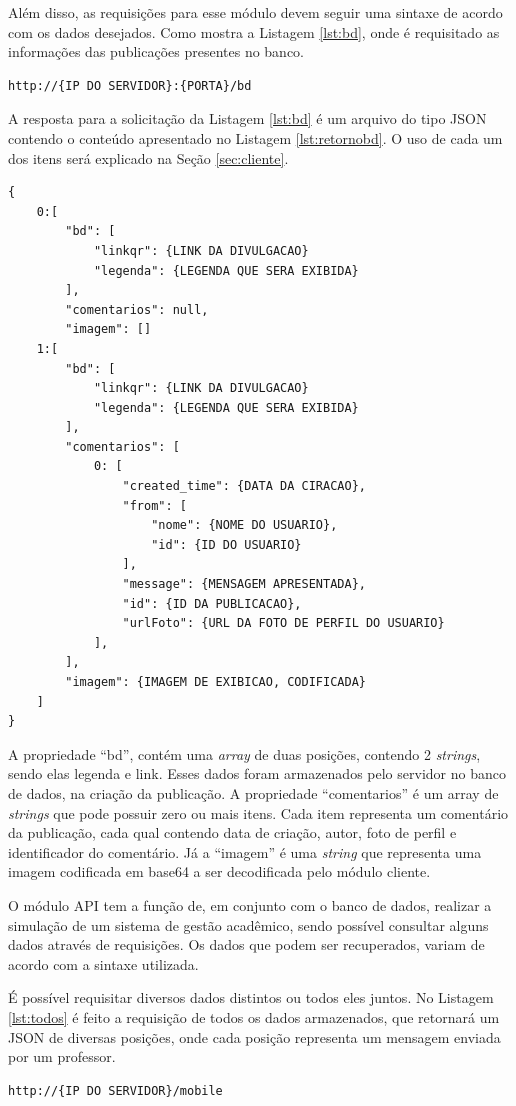 Além disso, as requisições para esse módulo devem seguir uma sintaxe de acordo com os dados desejados. Como mostra a Listagem \ref{lst:bd}, onde é requisitado as informações das publicações presentes no banco.

\begin{lstlisting}[caption={Requisitando dados para divulgação},label={lst:bd}]
	http://{IP DO SERVIDOR}:{PORTA}/bd
\end{lstlisting}

A resposta para a solicitação da Listagem \ref{lst:bd} é um arquivo do tipo JSON contendo o conteúdo apresentado no Listagem \ref{lst:retornobd}. O uso de cada um dos itens será explicado na Seção \ref{sec:cliente}.

\begin{lstlisting}[caption={Retorno da requisição \ref{lst:bd}},label={lst:retornobd}]
{
	0:[
		"bd": [
			"linkqr": {LINK DA DIVULGACAO}
			"legenda": {LEGENDA QUE SERA EXIBIDA}		
		],
		"comentarios": null,
		"imagem": []
	1:[
		"bd": [
			"linkqr": {LINK DA DIVULGACAO}
			"legenda": {LEGENDA QUE SERA EXIBIDA}
		],
		"comentarios": [
			0: [
				"created_time": {DATA DA CIRACAO},
				"from": [
					"nome": {NOME DO USUARIO},
					"id": {ID DO USUARIO}
				],
				"message": {MENSAGEM APRESENTADA},
				"id": {ID DA PUBLICACAO},
				"urlFoto": {URL DA FOTO DE PERFIL DO USUARIO}
			],
		],
		"imagem": {IMAGEM DE EXIBICAO, CODIFICADA}
	]
}
\end{lstlisting}

A propriedade ``bd'', contém uma \textit{array} de duas posições, contendo 2 \textit{strings}, sendo elas legenda e link. Esses dados foram armazenados pelo servidor no banco de dados, na criação da publicação. A propriedade ``comentarios'' é um array de \textit{strings} que pode possuir zero ou mais itens. Cada item representa um comentário da publicação, cada qual contendo data de criação, autor, foto de perfil e identificador do comentário. Já a ``imagem'' é uma \textit{string} que representa uma imagem codificada em base64 a ser decodificada pelo módulo cliente.

O módulo API tem a função de, em conjunto com o banco de dados, realizar a simulação de um sistema de gestão acadêmico, sendo possível consultar alguns dados através de requisições. Os dados que podem ser recuperados, variam de acordo com a sintaxe utilizada.

É possível requisitar diversos dados distintos ou todos eles juntos. 
No Listagem \ref{lst:todos} é feito a requisição de todos os dados armazenados, que retornará um JSON de diversas posições, onde cada posição representa um mensagem enviada por um professor.
\begin{lstlisting}[caption={Requisitar todos os dados},label={lst:todos}]
	http://{IP DO SERVIDOR}/mobile
\end{lstlisting}

